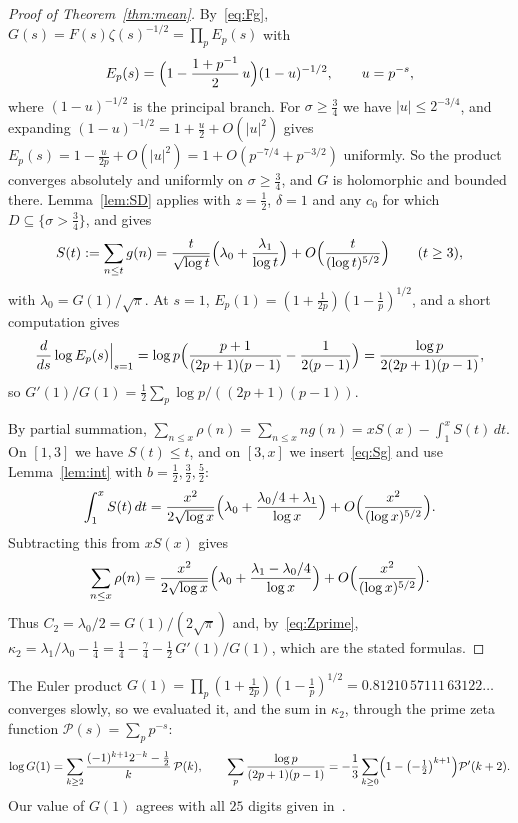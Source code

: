 \documentclass[11pt]{article}
\theoremstyle{definition}
\begin{document}
\begin{proof}[Proof of Theorem~\ref{thm:mean}]
By~\eqref{eq:Fg}, $G(s)=F(s)\zeta(s)^{-1/2}=\prod_pE_p(s)$ with
\[
  E_p(s)=\Bigl(1-\frac{1+p^{-1}}{2}\,u\Bigr)(1-u)^{-1/2},\qquad u=p^{-s},
\]
where $(1-u)^{-1/2}$ is the principal branch. For $\sigma\ge\tfrac34$ we have $|u|\le2^{-3/4}$, and expanding $(1-u)^{-1/2}=1+\tfrac u2+O(|u|^2)$ gives $E_p(s)=1-\tfrac{u}{2p}+O(|u|^2)=1+O(p^{-7/4}+p^{-3/2})$ uniformly. So the product converges absolutely and uniformly on $\sigma\ge\tfrac34$, and $G$ is holomorphic and bounded there. Lemma~\ref{lem:SD} applies with $z=\tfrac12$, $\delta=1$ and any $c_0$ for which $D\subseteq\{\sigma>\tfrac34\}$, and gives
\begin{equation}\label{eq:Sg}
  S(t):=\sum_{n\le t}g(n)=\frac{t}{\sqrt{\log t}}\Bigl(\lambda_0+\frac{\lambda_1}{\log t}\Bigr)+O\Bigl(\frac{t}{(\log t)^{5/2}}\Bigr)\qquad(t\ge3),
\end{equation}
with $\lambda_0=G(1)/\sqrt\pi$. At $s=1$, $E_p(1)=(1+\tfrac1{2p})(1-\tfrac1p)^{1/2}$, and a short computation gives
\[
  \frac{d}{ds}\log E_p(s)\Big|_{s=1}=\log p\Bigl(\frac{p+1}{(2p+1)(p-1)}-\frac{1}{2(p-1)}\Bigr)=\frac{\log p}{2(2p+1)(p-1)} ,
\]
so $G'(1)/G(1)=\tfrac12\sum_p\log p/((2p+1)(p-1))$.

By partial summation, $\sum_{n\le x}\rho(n)=\sum_{n\le x}ng(n)=xS(x)-\int_1^xS(t)\,dt$. On $[1,3]$ we have $S(t)\le t$, and on $[3,x]$ we insert~\eqref{eq:Sg} and use Lemma~\ref{lem:int} with $b=\tfrac12,\tfrac32,\tfrac52$:
\[
  \int_1^xS(t)\,dt=\frac{x^2}{2\sqrt{\log x}}\Bigl(\lambda_0+\frac{\lambda_0/4+\lambda_1}{\log x}\Bigr)+O\Bigl(\frac{x^2}{(\log x)^{5/2}}\Bigr).
\]
Subtracting this from $xS(x)$ gives
\[
  \sum_{n\le x}\rho(n)=\frac{x^2}{2\sqrt{\log x}}\Bigl(\lambda_0+\frac{\lambda_1-\lambda_0/4}{\log x}\Bigr)+O\Bigl(\frac{x^2}{(\log x)^{5/2}}\Bigr).
\]
Thus $C_2=\lambda_0/2=G(1)/(2\sqrt\pi)$ and, by~\eqref{eq:Zprime}, $\kappa_2=\lambda_1/\lambda_0-\tfrac14=\tfrac14-\tfrac{\gamma}4-\tfrac12\,G'(1)/G(1)$, which are the stated formulas.
\end{proof}

The Euler product $G(1)=\prod_p(1+\frac1{2p})(1-\frac1p)^{1/2}=0.81210\,57111\,63122\ldots$ converges slowly, so we evaluated it, and the sum in $\kappa_2$, through the prime zeta function $\mathcal P(s)=\sum_pp^{-s}$:
\[
  \log G(1)=\sum_{k\ge2}\frac{(-1)^{k+1}2^{-k}-\frac12}{k}\,\mathcal P(k),\qquad
  \sum_p\frac{\log p}{(2p+1)(p-1)}=-\frac13\sum_{k\ge0}\Bigl(1-\bigl(-\tfrac12\bigr)^{k+1}\Bigr)\mathcal P'(k+2).
\]
Our value of $G(1)$ agrees with all $25$ digits given in~\cite{FS}.
\end{document}
